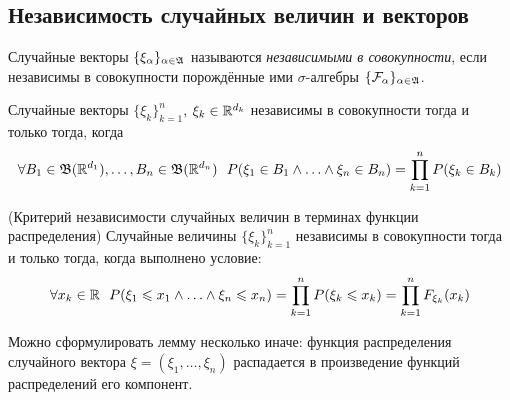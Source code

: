 \subsection{Независимость случайных величин и векторов}

\begin{definition}
	Случайные векторы $\{\xi_\alpha\}_{\alpha \in \mathfrak{A}}$ называются \textit{независимыми в совокупности}, если независимы в совокупности порождённые ими $\sigma$-алгебры $\{\mathcal{F}_\alpha\}_{\alpha \in \mathfrak{A}}$.
\end{definition}

\begin{corollary}
	Случайные векторы $\{\xi_k\}_{k = 1}^n$, $\xi_k \in \mathbb{R}^{d_k}$ независимы в совокупности тогда и только тогда, когда
	\[
		\forall B_1 \in \mathfrak{B}(\mathbb{R}^{d_1}), \ldots, B_n \in \mathfrak{B}(\mathbb{R}^{d_n})\ \ P(\xi_1 \in B_1 \wedge \ldots \wedge \xi_n \in B_n) = \prod_{k = 1}^n P(\xi_k \in B_k)
	\]
\end{corollary}

\begin{lemma} (Критерий независимости случайных величин в терминах функции распределения)
	Случайные величины $\{\xi_k\}_{k = 1}^n$ независимы в совокупности тогда и только тогда, когда выполнено условие:
	\[
		\forall x_k \in \mathbb{R}\ \ P(\xi_1 \leqslant x_1 \wedge \ldots \wedge \xi_n \leqslant x_n) = \prod_{k = 1}^n P(\xi_k \leqslant x_k) = \prod_{k = 1}^n F_{\xi_k}(x_k)
	\]
\end{lemma}

\begin{note}
	Можно сформулировать лемму несколько иначе: функция распределения случайного вектора $\xi = (\xi_1, \ldots, \xi_n)$ распадается в произведение функций распределений его компонент.
\end{note}

